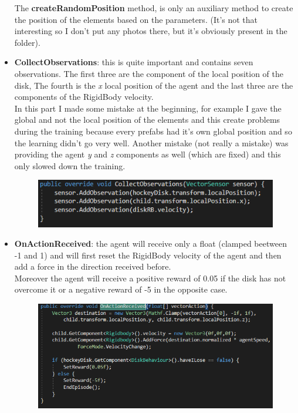 \documentclass[12pt]{article}
\begin{document}
\begin{itemize}
		The \textbf{createRandomPosition} method, is only an auxiliary method to create the position of the elements based on the parameters. (It's not that interesting so I don't put any photos there, but it's obviously present in the folder).
		
		\item \textbf{CollectObservations}: this is quite important and contains seven observations. The first three are the component of the local position of the disk, The fourth is the \textit{x} local position of the agent and the last three are the components of the RigidBody velocity.\\
		In this part I made some mistake at the beginning, for example I gave the global and not the local position of the elements and this create problems during the training because every prefabs had it's own global position and so the learning didn't go very well. Another mistake (not really a mistake) was providing the agent \textit{y} and \textit{z} components as well (which are fixed) and this only slowed down the training.
		
		\begin{figure}[hbt!]
			\centering
			\includegraphics[width= 1
			\textwidth]{images/CollectObservation.png}
		\end{figure}
	
		\item \textbf{OnActionReceived}: the agent will receive only a float (clamped beetween -1 and 1) and will first reset the RigidBody velocity of the agent and then add a force in the direction received before. \\
		Moreover the agent will receive a positive reward of 0.05 if the disk has not overcome it or a negative reward of -5 in the opposite case.
		
		\newpage
		
		\begin{figure}[hbt!]
			\centering
			\includegraphics[width= 1
			\textwidth]{images/OnActionReceived.png}
		\end{figure}
		
	\end{itemize}	
	
\end{document}
